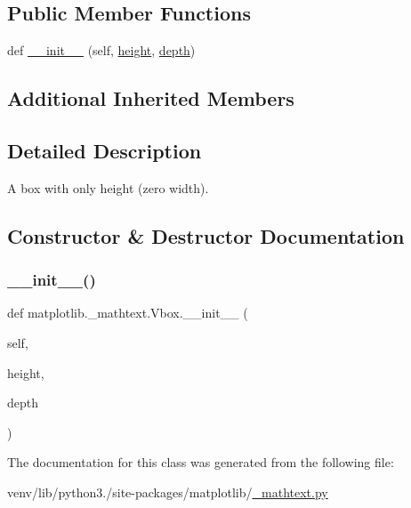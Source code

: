 \subsection*{Public Member Functions}
\begin{DoxyCompactItemize}
\item 
def \hyperlink{classmatplotlib_1_1__mathtext_1_1Vbox_aeaba9ac687915d4e4288b346fbabb403}{\+\_\+\+\_\+init\+\_\+\+\_\+} (self, \hyperlink{classmatplotlib_1_1__mathtext_1_1Box_a1cf957faa63df8993e57d9bcc8f1ef0f}{height}, \hyperlink{classmatplotlib_1_1__mathtext_1_1Box_aec283c7293e1d387b79c21c905a27afe}{depth})
\end{DoxyCompactItemize}
\subsection*{Additional Inherited Members}


\subsection{Detailed Description}
\begin{DoxyVerb}A box with only height (zero width).\end{DoxyVerb}
 

\subsection{Constructor \& Destructor Documentation}
\mbox{\label{classmatplotlib_1_1__mathtext_1_1Vbox_aeaba9ac687915d4e4288b346fbabb403}} 
\subsubsection{\texorpdfstring{\+\_\+\+\_\+init\+\_\+\+\_\+()}{\_\_init\_\_()}}
{\footnotesize\ttfamily def matplotlib.\+\_\+mathtext.\+Vbox.\+\_\+\+\_\+init\+\_\+\+\_\+ (\begin{DoxyParamCaption}\item[{}]{self,  }\item[{}]{height,  }\item[{}]{depth }\end{DoxyParamCaption})}



The documentation for this class was generated from the following file\+:\begin{DoxyCompactItemize}
\item 
venv/lib/python3./site-\/packages/matplotlib/\hyperlink{__mathtext_8py}{\+\_\+mathtext.\+py}\end{DoxyCompactItemize}
